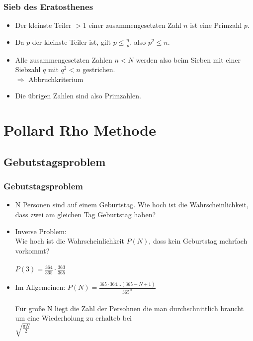 \documentclass[mathserif, compress]{beamer}
\begin{document}
\begin{frame}
  \frametitle{Sieb des Eratosthenes}   %

  \begin{itemize}
  \item<1-> Der kleinste Teiler $> 1$ einer zusammengesetzten Zahl $n$ ist eine Primzahl $p$. 
  \vspace{3mm}
  \item<2-> Da $p$ der kleinste Teiler ist, gilt $p \leq \frac{n}{p}$, also $ p^2 \leq n $.
  \vspace{3mm}
  \item<3-> Alle zusammengesetzten Zahlen $n<N$ werden also beim Sieben mit einer Siebzahl $q$ mit $q^2<n$ gestrichen.\\
            $\Rightarrow$ Abbruchkriterium
  \vspace{3mm}
  \item<4-> Die \"ubrigen Zahlen sind also Primzahlen.
  \end{itemize}
\end{frame}


\section{Pollard Rho Methode}

\subsection{Gebutstagsproblem}

\begin{frame}
  \frametitle{Gebutstagsproblem}
  \begin{itemize}
    \item<1-> N Personen sind auf einem Geburtstag. Wie hoch ist die Wahrscheinlichkeit, dass zwei am gleichen Tag Geburtstag haben?
    \vspace{3mm}
    \item<2-> Inverse Problem: \\ Wie hoch ist die Wahrscheinlichkeit $P(N)$, dass kein Geburtstag mehrfach vorkommt?\\
    \ \\ $P(3)=\frac{364}{365}\cdot \frac{363}{365}$
    \vspace{3mm}
    \item<3-> Im Allgemeinen: $P(N)=\frac{365\cdot 364...(365-N+1)}{365^N}$\\
    \ \\     F\"ur gro\ss{}e N liegt die Zahl der Persohnen die man durchschnittlich braucht um eine Wiederholung zu erhalteb bei \\
	     $\sqrt{\frac{\pi N}{2}}$
  \end{itemize}
\end{frame}
\end{document}
